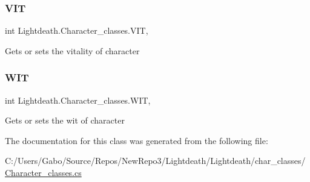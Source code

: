 \subsubsection{\texorpdfstring{V\+IT}{VIT}}
{\footnotesize\ttfamily int Lightdeath.\+Character\+\_\+classes.\+V\+IT\hspace{0.3cm}{\ttfamily [get]}, {\ttfamily [set]}}



Gets or sets the vitality of character 

\hypertarget{class_lightdeath_1_1_character__classes_a26cc95914cc503056a8909731959c0b9}{}\label{class_lightdeath_1_1_character__classes_a26cc95914cc503056a8909731959c0b9} 
\subsubsection{\texorpdfstring{W\+IT}{WIT}}
{\footnotesize\ttfamily int Lightdeath.\+Character\+\_\+classes.\+W\+IT\hspace{0.3cm}{\ttfamily [get]}, {\ttfamily [set]}}



Gets or sets the wit of character 



The documentation for this class was generated from the following file\+:\begin{DoxyCompactItemize}
\item 
C\+:/\+Users/\+Gabo/\+Source/\+Repos/\+New\+Repo3/\+Lightdeath/\+Lightdeath/char\+\_\+classes/\hyperlink{_character__classes_8cs}{Character\+\_\+classes.\+cs}\end{DoxyCompactItemize}
